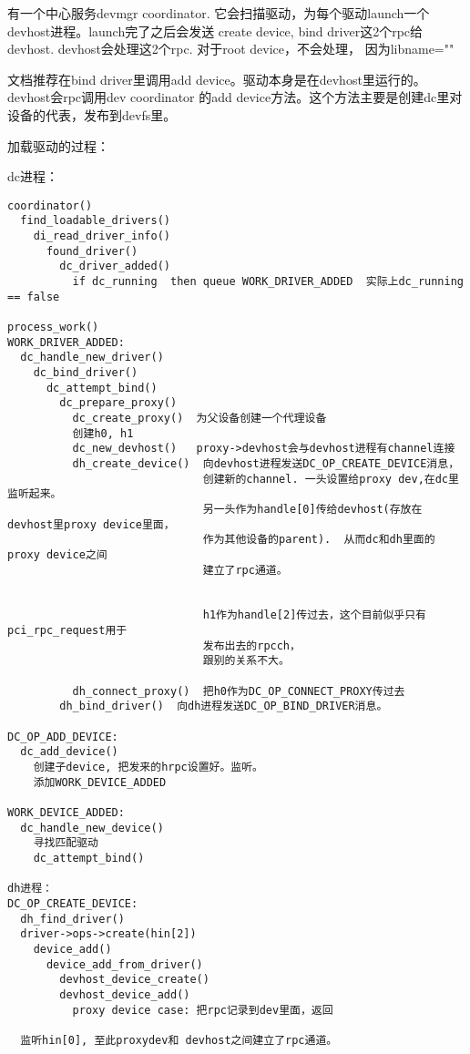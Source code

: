 有一个中心服务devmgr coordinator. 它会扫描驱动，为每个驱动launch一个devhost进程。launch完了之后会发送
create device, bind driver这2个rpc给devhost. devhost会处理这2个rpc. 对于root device，不会处理，
因为libname=""

文档推荐在bind driver里调用add device。驱动本身是在devhost里运行的。devhost会rpc调用dev coordinator
的add device方法。这个方法主要是创建dc里对设备的代表，发布到devfs里。


加载驱动的过程：

dc进程：
\begin{verbatim}
coordinator()
  find_loadable_drivers()
    di_read_driver_info()
      found_driver()
        dc_driver_added()
          if dc_running  then queue WORK_DRIVER_ADDED  实际上dc_running == false

process_work()
WORK_DRIVER_ADDED:
  dc_handle_new_driver()
    dc_bind_driver()
      dc_attempt_bind()
        dc_prepare_proxy()
          dc_create_proxy()  为父设备创建一个代理设备
          创建h0, h1
          dc_new_devhost()   proxy->devhost会与devhost进程有channel连接
          dh_create_device()  向devhost进程发送DC_OP_CREATE_DEVICE消息，
                              创建新的channel. 一头设置给proxy dev,在dc里监听起来。
                              另一头作为handle[0]传给devhost(存放在devhost里proxy device里面，
                              作为其他设备的parent).  从而dc和dh里面的proxy device之间
                              建立了rpc通道。


                              h1作为handle[2]传过去，这个目前似乎只有pci_rpc_request用于
                              发布出去的rpcch，
                              跟别的关系不大。

          dh_connect_proxy()  把h0作为DC_OP_CONNECT_PROXY传过去
        dh_bind_driver()  向dh进程发送DC_OP_BIND_DRIVER消息。

DC_OP_ADD_DEVICE:
  dc_add_device()
    创建子device, 把发来的hrpc设置好。监听。
    添加WORK_DEVICE_ADDED

WORK_DEVICE_ADDED:
  dc_handle_new_device()
    寻找匹配驱动
    dc_attempt_bind()
                
dh进程：
DC_OP_CREATE_DEVICE:
  dh_find_driver()
  driver->ops->create(hin[2])
    device_add()
      device_add_from_driver()
        devhost_device_create()
        devhost_device_add()
          proxy device case: 把rpc记录到dev里面，返回
          
  监听hin[0], 至此proxydev和 devhost之间建立了rpc通道。


\end{verbatim}
